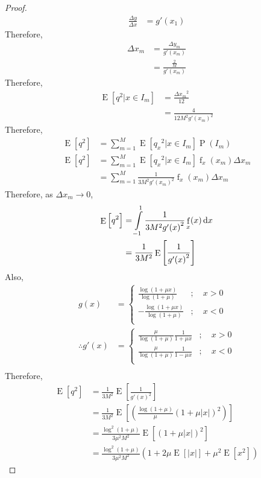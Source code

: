 \documentclass[titlepage, fleqn, a4paper, 12pt, twoside]{article}
\theoremstyle{definition}
\theoremstyle{theorem}
\DeclareMathOperator{\pdf}{\mathrm{f}}
\DeclareMathOperator{\prob}{\mathrm{P}}
\DeclareMathOperator{\expct}{\mathrm{E}}
\begin{document}
\begin{proof}
	\begin{align*}
		\frac{\Delta y}{\Delta x} &= g'(x_1)
	\end{align*}
	Therefore,
	\begin{align*}
		\Delta x_m &= \frac{\Delta y_m}{g'(x_m)}\\
		&= \frac{\frac{2}{M}}{g'(x_m)}
	\end{align*}
	Therefore,
	\begin{align*}
		\expct\left[ q^2 \Big| x \in I_m \right] &= \frac{{\Delta x_m}^2}{12}\\
		&= \frac{4}{12 M^2 {g'(x_m)}^2}
	\end{align*}
	Therefore,
	\begin{align*}
		\expct\left[ q^2 \right] &= \sum\limits_{m = 1}^{M} \expct\left[ {q_x}^2 \Big| x \in I_m \right] \prob(I_m)\\
		\expct\left[ q^2 \right] &= \sum\limits_{m = 1}^{M} \expct\left[ {q_x}^2 \Big| x \in I_m \right] \pdf_x(x_m) \Delta x_m\\
		&= \sum\limits_{m = 1}^{M} \frac{1}{3 M^2 {g'(x_m)}^2} \pdf_x(x_m) \Delta x_m
	\end{align*}
	Therefore, as $\Delta x_m \to 0$,
	\begin{align*}
		\expct\left[ q^2 \right] &= \int\limits_{-1}^{1} \frac{1}{3 M^2 {g'(x)}^2} \pdf_x(x) \dif x\\
		&= \frac{1}{3 M^2} \expct\left[ \frac{1}{{g'(x)}^2} \right]\\
	\end{align*}
	Also,
	\begin{align*}
		g(x) &=
			\begin{cases}
				\frac{\log(1 + \mu x)}{\log(1 + \mu)} &;\quad x > 0\\
				-\frac{\log(1 + \mu x)}{\log(1 + \mu)} &;\quad x < 0\\
			\end{cases}\\
		\therefore g'(x) &=
			\begin{cases}
				\frac{\mu}{\log(1 + \mu)} \frac{1}{1 + \mu x} &;\quad x > 0\\
				\frac{\mu}{\log(1 + \mu)} \frac{1}{1 - \mu x} &;\quad x < 0\\
			\end{cases}\\
	\end{align*}
	Therefore,
	\begin{align*}
		\expct\left[ q^2 \right] &= \frac{1}{3 M^2} \expct\left[ \frac{1}{{g'(x)}^2} \right]\\
		&= \frac{1}{3 M^2} \expct\left[ \left( \frac{\log(1 + \mu)}{\mu} \left( 1 + \mu |x| \right)^2 \right) \right]\\
		&= \frac{\log^2(1 + \mu)}{3 \mu^2 M^2} \expct\left[ \left( 1 + \mu |x| \right)^2 \right]\\
		&= \frac{\log^2(1 + \mu)}{3 \mu^2 M^2} \left( 1 + 2 \mu \expct\left[ |x| \right] + \mu^2 \expct\left[ x^2 \right] \right)
	\end{align*}
\end{proof}
\end{document}

